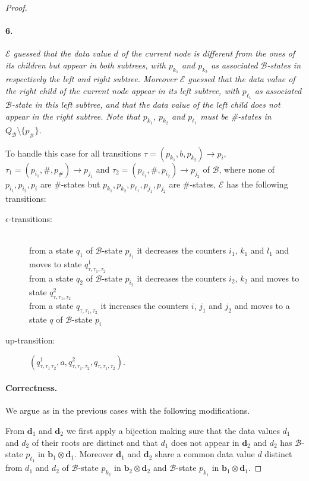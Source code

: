 \documentclass{CSML}
\newcommand\ra{\ensuremath{\rightarrow}}
\newcommand\Ba{\mathcal{B}}
\newcommand\Ea{\mathcal{E}}
\newcommand\btree{\boldsymbol{b}}
\newcommand\dtree{\boldsymbol{d}}
\begin{document}
\begin{proof}
\paragraph{\bf 6.}
  \emph{$\Ea$ guessed that the data value $d$ of the
  current node is different from the ones of its children but appear in both
  subtrees, with $p_{k_1}$ and $p_{k_2}$ as associated $\Ba$-states in respectively the left and right subtree. 
  Moreover $\Ea$ guessed that the data value of the right child of the current node appear in its
  left subtree, with $p_{\ell_1}$ as associated $\Ba$-state in this left subtree, 
  and that the data value of the left child does not appear in the right subtree. 
  Note that $p_{k_1}$, $p_{k_2}$ and $p_{\ell_1}$ must be \#-states in $Q_\Ba \setminus \{ p_\#\}$.}

\noindent
To handle this case for all transitions 
$\tau = (p_{k_1},b,p_{k_2}) \ra p_{i}$,
$\tau_1 = (p_{i_1},\#,p_{\#})\ra p_{j_1}$ and 
$\tau_2 = (p_{\ell_1},\#,p_{i_2})\ra p_{j_2}$ of $\Ba$, 
where none of $p_{i_1},p_{i_2}, p_i$ are $\#$-states but
$p_{k_1},p_{k_2},p_{\ell_1},p_{j_1},p_{j_2}$ are $\#$-states, $\Ea$ has the following transitions:
\begin{description}
\item[\rm $\epsilon$-transitions:]\quad\\
from a state $q_1$ of $\Ba$-state $p_{i_1}$
it decreases the counters $i_1$, $k_1$ and $l_1$ 
and moves to state $q_{\tau,\tau_1,\tau_2}^1$\\
from a state $q_2$ of $\Ba$-state $p_{i_2}$ 
it decreases the counters $i_2$, $k_2$ 
and moves to state $q_{\tau,\tau_1,\tau_2}^2$\\
from a state $q_{\tau,\tau_1,\tau_2}$
it increases the counters $i$, $j_1$ and $j_2$ 
and moves to a state $q$ of $\Ba$-state $p_i$

\item[\rm up-transition:]
$(q_{\tau,\tau_1\,\tau_2}^1,a,q_{\tau,\tau_1,\tau_2}^2,q_{\tau,\tau_1,\tau_2})$.
\end{description}

\paragraph{\bf Correctness.}  
We argue as in the previous cases with the following modifications.

From $\dtree_1$ and $\dtree_2$ we first apply a bijection making sure that the
data values $d_1$ and $d_2$ of their roots are distinct and that $d_1$ does not
appear in $\dtree_2$ and $d_2$ has $\Ba$-state $p_{\ell_1}$ in
$\btree_1\otimes\dtree_1$. Moreover $\dtree_1$ and $\dtree_2$ share a common data value $d$
distinct from $d_1$ and $d_2$ of $\Ba$-state $p_{k_2}$ in $\btree_2\otimes\dtree_2$ and
$\Ba$-state $p_{k_1}$ in $\btree_1\otimes\dtree_1$.


\end{proof}
\end{document}
